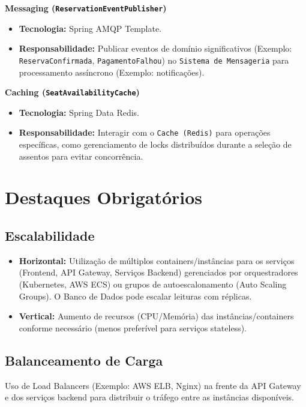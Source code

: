 \textbf{Messaging (\texttt{ReservationEventPublisher})}
\begin{itemize}
    \item \textbf{Tecnologia:} Spring AMQP Template.
    \item \textbf{Responsabilidade:} Publicar eventos de domínio significativos (Exemplo: \texttt{ReservaConfirmada}, \texttt{PagamentoFalhou}) no \texttt{Sistema de Mensageria} para processamento assíncrono (Exemplo: notificações).
\end{itemize}

\textbf{Caching (\texttt{SeatAvailabilityCache})}
\begin{itemize}
    \item \textbf{Tecnologia:} Spring Data Redis.
    \item \textbf{Responsabilidade:} Interagir com o \texttt{Cache (Redis)} para operações específicas, como gerenciamento de locks distribuídos durante a seleção de assentos para evitar concorrência.
\end{itemize}

\section{Destaques Obrigatórios}
\label{sec:destaques-obrigatorios}

\subsection{Escalabilidade}
\label{subsec:escalabilidade}
\begin{itemize}
    \item \textbf{Horizontal:} Utilização de múltiplos containers/instâncias para os serviços (Frontend, API Gateway, Serviços Backend) gerenciados por orquestradores (Kubernetes, AWS ECS) ou grupos de autoescalonamento (Auto Scaling Groups). O Banco de Dados pode escalar leituras com réplicas.
    \item \textbf{Vertical:} Aumento de recursos (CPU/Memória) das instâncias/containers conforme necessário (menos preferível para serviços stateless).
\end{itemize}

\subsection{Balanceamento de Carga}
\label{subsec:balanceamento-carga}
Uso de Load Balancers (Exemplo: AWS ELB, Nginx) na frente da API Gateway e dos serviços backend para distribuir o tráfego entre as instâncias disponíveis.


